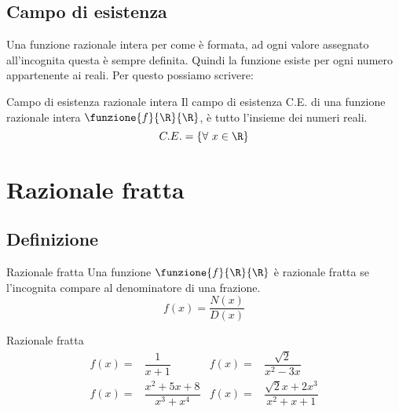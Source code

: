 \subsection{Campo di esistenza}
Una funzione razionale intera per come è formata, ad  ogni valore assegnato all'incognita questa è sempre  definita. Quindi la funzione esiste per ogni numero appartenente ai reali. Per questo possiamo scrivere:
\begin{definizionet}{Campo di esistenza razionale intera}{}
Il campo di esistenza C.E. di una funzione razionale intera 
$\funzione{f}{\R}{\R}$, è tutto l'insieme dei numeri reali.
\[C.E.=\lbrace\forall\ x\in\R\rbrace\]
\end{definizionet} 

\section{Razionale fratta}
\subsection{Definizione}
\begin{definizionet}{Razionale fratta}{}
	Una funzione $\funzione{f}{\R}{\R}$ è razionale fratta se l'incognita compare al denominatore di una frazione.
	\[f(x)=\dfrac{N(x)}{D(x)}\]
\end{definizionet}
\begin{esempiot}{Razionale fratta}{}
	\begin{align*}
	f(x)=&\dfrac{1}{x+1}&f(x)=&\dfrac{\sqrt{2}}{x^2-3x}\\
	f(x)=&\dfrac{x^2+5x+8}{x^3+x^4}&f(x)=&\dfrac{\sqrt{2}x+2x^3}{x^2+x+1}
	\end{align*}
\end{esempiot}
